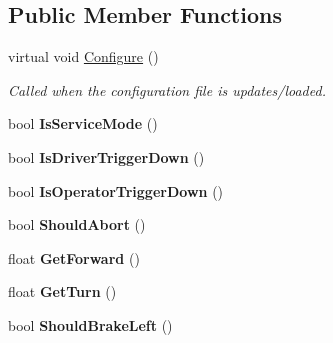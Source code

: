 \subsection*{\-Public \-Member \-Functions}
\begin{DoxyCompactItemize}
\item 
\hypertarget{class_processed_inputs_a1f0152816b139c97d150c103208202b5}{
virtual void \hyperlink{class_processed_inputs_a1f0152816b139c97d150c103208202b5}{\-Configure} ()}
\label{class_processed_inputs_a1f0152816b139c97d150c103208202b5}

\begin{DoxyCompactList}\small\item\em \-Called when the configuration file is updates/loaded. \end{DoxyCompactList}\item 
\hypertarget{class_processed_inputs_ae0d0d9579ff79d56b5bb157f188fb2fe}{
bool {\bfseries \-Is\-Service\-Mode} ()}
\label{class_processed_inputs_ae0d0d9579ff79d56b5bb157f188fb2fe}

\item 
\hypertarget{class_processed_inputs_a34a3925e933c33cd4bdc912c94f5ba70}{
bool {\bfseries \-Is\-Driver\-Trigger\-Down} ()}
\label{class_processed_inputs_a34a3925e933c33cd4bdc912c94f5ba70}

\item 
\hypertarget{class_processed_inputs_a21f76b4bdf5b023343e410833a732a76}{
bool {\bfseries \-Is\-Operator\-Trigger\-Down} ()}
\label{class_processed_inputs_a21f76b4bdf5b023343e410833a732a76}

\item 
\hypertarget{class_processed_inputs_a0791fdd4de93770eac8cf5e49bef3ef0}{
bool {\bfseries \-Should\-Abort} ()}
\label{class_processed_inputs_a0791fdd4de93770eac8cf5e49bef3ef0}

\item 
\hypertarget{class_processed_inputs_a582f9b5b7ffdef07f779a59cf4f87ea8}{
float {\bfseries \-Get\-Forward} ()}
\label{class_processed_inputs_a582f9b5b7ffdef07f779a59cf4f87ea8}

\item 
\hypertarget{class_processed_inputs_aebbffcdcb6a01b4e61543f2e1c97ea17}{
float {\bfseries \-Get\-Turn} ()}
\label{class_processed_inputs_aebbffcdcb6a01b4e61543f2e1c97ea17}

\item 
\hypertarget{class_processed_inputs_a413dff24b8852f2de0cad48d53081119}{
bool {\bfseries \-Should\-Brake\-Left} ()}
\label{class_processed_inputs_a413dff24b8852f2de0cad48d53081119}


\end{DoxyCompactItemize}
